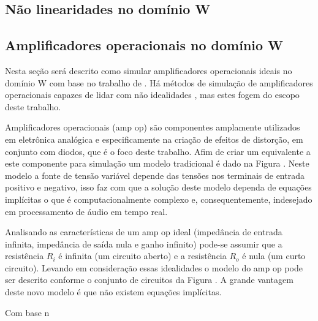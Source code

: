 	

	

	\subsection{Não linearidades no domínio W}
	
	\subsection{Amplificadores operacionais no domínio W}
	
	Nesta seção será descrito como simular amplificadores operacionais ideais no domínio W com base no trabalho de . Há métodos de simulação de amplificadores operacionais capazes de lidar com não idealidades \cite{Werner2015} \cite{Werner2016}, mas estes fogem do escopo deste trabalho. 
	
	
	Amplificadores operacionais (amp op) são componentes amplamente utilizados em eletrônica analógica e especificamente na criação de efeitos de distorção, em conjunto com diodos, que é o foco deste trabalho. Afim de criar um equivalente a este componente para simulação um modelo tradicional é dado na Figura  \cite{Boylestad2002}. Neste modelo a fonte de tensão variável depende das tensões nos terminais de entrada positivo e negativo, isso faz com que a solução deste modelo dependa de equações implícitas o que é computacionalmente complexo e, consequentemente, indesejado em processamento de áudio em tempo real.
	
	Analisando as características de um amp op ideal (impedância de entrada infinita, impedância de saída nula e ganho infinito) pode-se assumir que a resistência $R_i$ é infinita (um circuito aberto) e a resistência $R_o$ é nula (um curto circuito). Levando em consideração essas idealidades o modelo do amp op pode ser descrito conforme o conjunto de circuitos da Figura . A grande vantagem deste novo modelo é que não existem equações implícitas.
	
	Com base n
	
